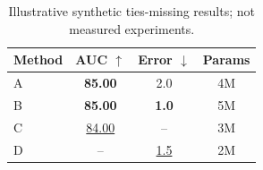 \begin{table}[t]
\centering
\caption{Illustrative synthetic ties-missing results; not measured experiments.}
\label{tab:ties-missing}
\begin{tabular}{@{}lccc@{}}
\toprule
Method & AUC $\uparrow$ & Error $\downarrow$ & Params \\
\midrule
A & \textbf{85.00} & 2.0 & 4M \\
B & \textbf{85.00} & \textbf{1.0} & 5M \\
C & \underline{84.00} & -- & 3M \\
D & -- & \underline{1.5} & 2M \\
\bottomrule
\end{tabular}
\end{table}
